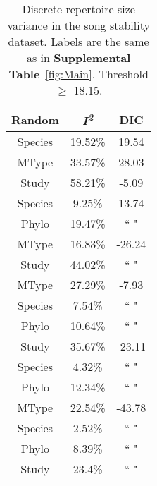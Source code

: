 \documentclass{article}
\begin{document}
  \begin{table}[H]
  \centering
  \caption{Discrete repertoire size variance in the song stability dataset. Labels are the same as in \textbf{Supplemental Table}~\ref{fig:Main}. Threshold $\ge$ 18.15.} 
  \begin{tabular}{ccc}
  \hline
  Random & \textit{I\textsuperscript{2}} & DIC \\ 
  \hline
  Species & 19.52\% & 19.54 \\ \hdashline
  MType & 33.57\% & 28.03 \\ \hdashline
  Study & 58.21\% & -5.09 \\ \hdashline
  Species & 9.25\% & 13.74 \\ 
  Phylo & 19.47\% & `` " \\ \hdashline
  MType & 16.83\% & -26.24 \\ 
  Study & 44.02\% & `` " \\ \hdashline
  MType & 27.29\% & -7.93 \\ 
  Species & 7.54\% & `` " \\ 
  Phylo & 10.64\% & `` " \\ \hdashline
  Study & 35.67\% & -23.11 \\ 
  Species & 4.32\% & `` " \\ 
  Phylo & 12.34\% & `` " \\ \hdashline
  MType & 22.54\% & -43.78 \\ 
  Species & 2.52\% & `` " \\ 
  Phylo & 8.39\% & `` " \\ 
  Study & 23.4\% & `` " \\ 
  \hline
  \end{tabular}
  \end{table}
\end{document}
